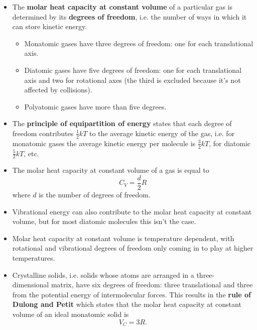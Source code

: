 \documentclass{article}
\begin{document}
\begin{itemize}
  \item The \textbf{molar heat capacity at constant volume} of a particular gas is determined by its \textbf{degrees of freedom}, i.e. the number of ways in which it can store kinetic energy.

        \begin{itemize}
          \item Monatomic gases have three degrees of freedom: one for each translational axis.

          \item Diatomic gases have five degrees of freedom: one for each translational axis and two for rotational axes (the third is excluded because it's not affected by collisions).

          \item Polyatomic gases have more than five degrees.
        \end{itemize}

\item The \textbf{principle of equipartition of energy} states that each degree of freedom contributes $\frac{1}{2} k T$ to the average kinetic energy of the gas, i.e. for monatomic gases the average kinetic energy per molecule is $\frac{3}{2} k T$, for diatomic $\frac{5}{2} k T$, etc.

\item The molar heat capacity at constant volume of a gas is equal to \[C_V = \frac{d}{2} R\] where $d$ is the number of degrees of freedom.

  \item Vibrational energy can also contribute to the molar heat capacity at constant volume, but for most diatomic molecules this isn't the case.

  \item Molar heat capacity at constant volume is temperature dependent, with rotational and vibrational degrees of freedom only coming in to play at higher temperatures.

  \item Crystalline solids, i.e. solids whose atoms are arranged in a three-\\dimensional matrix, have six degrees of freedom: three translational and three from the potential energy of intermolecular forces. This results in the \textbf{rule of Dulong and Petit} which states that the molar heat capacity at constant volume of an ideal monatomic solid is \[V_C = 3 R.\]
\end{itemize}
\end{document}
